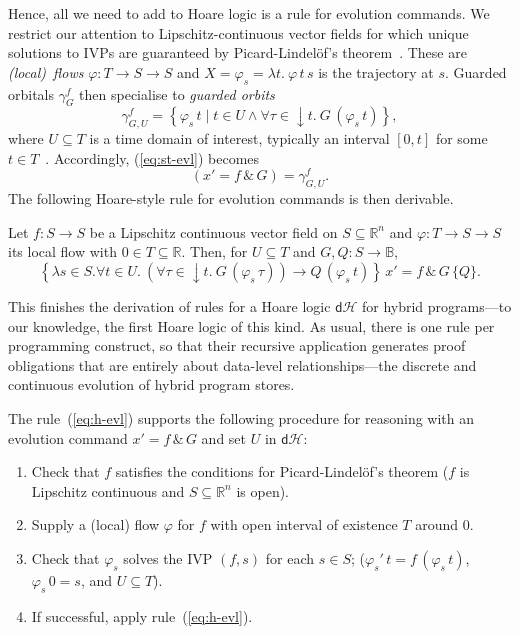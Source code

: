 \documentclass[envcountsame,envcountsect]{llncs}
\newcommand{\dH}{\mathsf{d}\mathcal{H}}
\newcommand{\flow}{\varphi}
\newcommand{\reals}{\mathbb{R}}
\newcommand{\bools}{\mathbb{B}}
\begin{document}
Hence, all we need to add to Hoare logic is a rule for evolution
commands.  We restrict our attention to Lipschitz-continuous vector
fields for which unique solutions to IVPs are guaranteed by
Picard-Lindel\"of's theorem~\cite{Teschl12}.  These are \emph{(local)\
  flows} $\flow:T\to S\to S$ and $X=\flow_s=\lambda t.\ \flow\, t\, s$
is the trajectory at $s$. Guarded orbitals $\gamma^f_G$ then
specialise to \emph{guarded orbits}
\begin{equation*}
  \gamma^f_{G,U} = \left\{\flow_s\, t\mid t\in U\land \forall\tau \in
  {\downarrow}t.\ G\, (\flow_s\, t)\right\},
\end{equation*}
where $U\subseteq T$ is a time domain of interest, typically an
interval $[0,t]$ for some $t\in T$~\cite{MuniveS19}.  Accordingly,
(\ref{eq:st-evl}) becomes
\begin{equation}
  \left(x' = f\, \&\, G\right)= \gamma^f_{G,U}.\label{eq:st-evl-flow}\tag{st-evl-flow}
\end{equation}
The following Hoare-style rule for evolution commands is then
derivable.
\begin{lemma}\label{P:h-evl-lemma}
  Let $f:S\to S$ be a Lipschitz continuous vector field on
  $S\subseteq \reals^n$ and $\flow:T\to S\to S$ its local flow with
  $0\in T\subseteq \reals$. Then, for $U\subseteq T$ and
  $G,Q:S\to\bools$,
\begin{equation}
\left\{\lambda s\in S.\forall t\in U.\ \left(\forall
\tau\in {\downarrow}t.\ G\, (\flow_s\, \tau)\right) \rightarrow Q\,
(\flow_s\, t)\right\}\, x' = f\, \&\, G\, \{Q\}. \label{eq:h-evl}\tag{h-evl}
\end{equation}
\end{lemma}

This finishes the derivation of rules for a Hoare logic $\dH$ for
hybrid programs---to our knowledge, the first Hoare logic of this
kind. As usual, there is one rule per programming construct, so that
their recursive application generates proof obligations that are
entirely about data-level relationships---the discrete and continuous
evolution of hybrid program stores.

The rule~(\ref{eq:h-evl}) supports the following procedure
for reasoning with an evolution command $x' = f\, \&\, G$ and set $U$
in $\dH$:
\begin{enumerate}
\item Check that $f$ satisfies the conditions for Picard-Lindel\"of's
  theorem ($f$ is Lipschitz continuous and $S\subseteq\reals^n$ is
  open).
\item Supply a (local) flow $\flow$ for $f$ with open interval of
  existence $T$ around $0$.
\item Check that $\flow_s$ solves the IVP $(f,s)$ for each $s\in S$;
  ($\flow_s'\, t = f\, (\flow_s\, t)$, $\flow_s\, 0 = s$, and
  $U\subseteq T$).
\item If successful, apply rule~(\ref{eq:h-evl}).
\end{enumerate}
\end{document}
